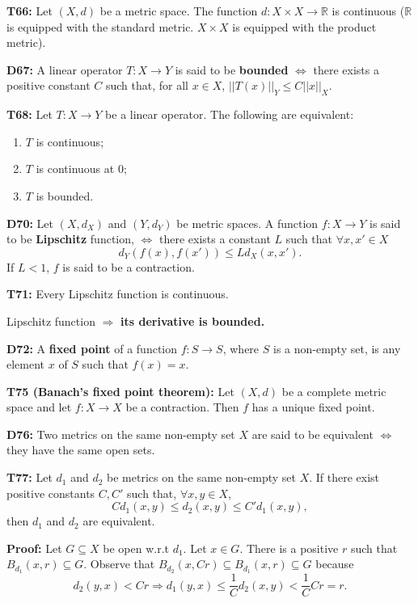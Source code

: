 \documentclass[twocolumn,10pt]{article}
\begin{document}
\textbf{T66:} Let $(X,d)$ be a metric space. The function $d:X\times X\to\mathbb{R}$ is continuous ($\mathbb{R}$ is equipped with the standard metric. $X\times X$ is equipped with the product metric).

\textbf{D67:} A linear operator $T:X\to Y$ is said to be \textbf{bounded} $\Leftrightarrow$ there exists a positive constant $C$ such that, for all $x\in X$, $||T(x)||_Y\leq C||x||_X$.

\textbf{T68:} Let $T:X\to Y$ be a linear operator. The following are equivalent:
\begin{enumerate}
    \item $T$ is continuous;
    \item $T$ is continuous at $0$;
    \item $T$ is bounded.
\end{enumerate}
\textbf{D70:} Let $(X,d_X)$ and $(Y,d_Y)$ be metric spaces. A function $f:X\to Y$ is said to be \textbf{Lipschitz} function, $\Leftrightarrow$ there exists a constant $L$ such that $\forall x,x'\in X$
\begin{equation*}
    d_Y(f(x),f(x')) \leq Ld_X(x,x').
\end{equation*}
If $L<1$, $f$ is said to be a contraction.

\textbf{T71:} Every Lipschitz function is continuous.

Lipschitz function $\Rightarrow$ \textbf{its derivative is bounded.}

\textbf{D72:} A \textbf{fixed point} of a function $f:S\to S$, where $S$ is a non-empty set, is any element $x$ of $S$ such that $f(x)=x$.

\textbf{T75 (Banach's fixed point theorem):} Let $(X,d)$ be a complete metric space and let $f:X\to X$ be a contraction. Then $f$ has a unique fixed point.

\textbf{D76:} Two metrics on the same non-empty set $X$ are said to be equivalent $\Leftrightarrow$ they have the same open sets.

\textbf{T77:} Let $d_1$ and $d_2$ be metrics on the same non-empty set $X$. If there exist positive constants $C,C'$ such that, $\forall x,y\in X$,
\begin{equation*}
    Cd_1(x,y) \leq d_2(x,y) \leq C'd_1(x,y),
\end{equation*}
then $d_1$ and $d_2$ are equivalent.

\color{red}
\textbf{Proof:} Let $G\subseteq X$ be open w.r.t $d_1$. Let $x\in G$. There is a positive $r$ such that $B_{d_1}(x,r)\subseteq G$. Observe that $B_{d_2}(x,Cr)\subseteq B_{d_1}(x,r)\subseteq G$ because
\begin{equation*}
    d_2(y,x) < Cr \Rightarrow d_1(y,x) \leq \frac{1}{C}d_2(x,y) < \frac{1}{C}Cr = r.
\end{equation*}
\color{black}
\end{document}
